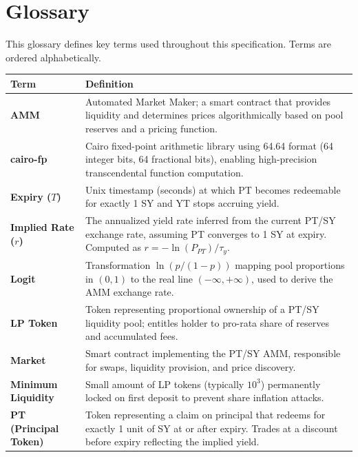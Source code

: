 
\section*{Glossary}
\label{sec:glossary}

This glossary defines key terms used throughout this specification. Terms are ordered alphabetically.

\begin{center}
\begin{tabularx}{\textwidth}{l >{\raggedright\arraybackslash}X}
\toprule
\textbf{Term} & \textbf{Definition} \\
\midrule

\textbf{AMM} &
Automated Market Maker; a smart contract that provides liquidity and determines prices algorithmically based on pool reserves and a pricing function. \\

\textbf{cairo-fp} &
Cairo fixed-point arithmetic library using 64.64 format (64 integer bits, 64 fractional bits), enabling high-precision transcendental function computation. \\

\textbf{Expiry ($T$)} &
Unix timestamp (seconds) at which PT becomes redeemable for exactly 1 SY and YT stops accruing yield. \\

\textbf{Implied Rate ($r$)} &
The annualized yield rate inferred from the current PT/SY exchange rate, assuming PT converges to 1 SY at expiry. Computed as $r = -\ln(P_{PT}) / \tau_y$. \\

\textbf{Logit} &
Transformation $\ln(p/(1-p))$ mapping pool proportions in $(0,1)$ to the real line $(-\infty, +\infty)$, used to derive the AMM exchange rate. \\

\textbf{LP Token} &
Token representing proportional ownership of a PT/SY liquidity pool; entitles holder to pro-rata share of reserves and accumulated fees. \\

\textbf{Market} &
Smart contract implementing the PT/SY AMM, responsible for swaps, liquidity provision, and price discovery. \\

\textbf{Minimum Liquidity} &
Small amount of LP tokens (typically $10^3$) permanently locked on first deposit to prevent share inflation attacks. \\

\textbf{PT (Principal Token)} &
Token representing a claim on principal that redeems for exactly 1 unit of SY at or after expiry. Trades at a discount before expiry reflecting the implied yield. \\


\end{tabularx}
\end{center}
